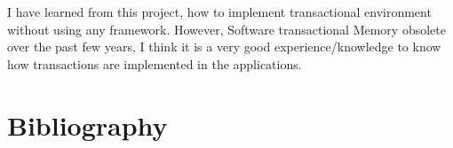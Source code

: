 \documentclass[12pt]{article}
\begin{document}
I have learned from this project, how to implement transactional environment without using any framework. However, Software transactional Memory obsolete over the past few years, I think it is a very good experience/knowledge to know how transactions are implemented in the applications.
\newpage
\section{Bibliography}
\begin{center}



\end{center}
\end{document}
